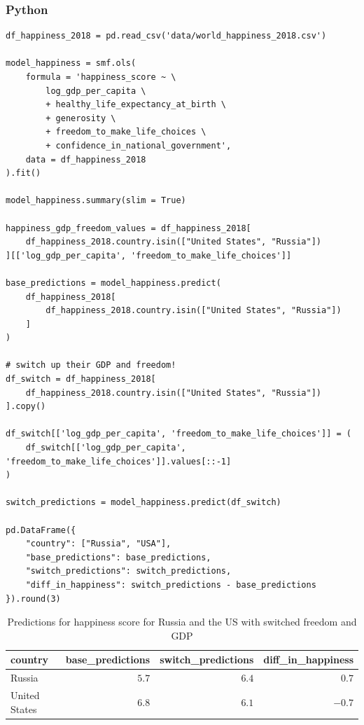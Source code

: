 \documentclass[
  letterpaper,
]{krantz}
\begin{document}
\subsubsection{Python}

\begin{verbatim}
df_happiness_2018 = pd.read_csv('data/world_happiness_2018.csv')

model_happiness = smf.ols(
    formula = 'happiness_score ~ \
        log_gdp_per_capita \
        + healthy_life_expectancy_at_birth \
        + generosity \
        + freedom_to_make_life_choices \
        + confidence_in_national_government',
    data = df_happiness_2018
).fit()

model_happiness.summary(slim = True)

happiness_gdp_freedom_values = df_happiness_2018[
    df_happiness_2018.country.isin(["United States", "Russia"])
][['log_gdp_per_capita', 'freedom_to_make_life_choices']]

base_predictions = model_happiness.predict(
    df_happiness_2018[
        df_happiness_2018.country.isin(["United States", "Russia"])
    ]
)

# switch up their GDP and freedom!
df_switch = df_happiness_2018[
    df_happiness_2018.country.isin(["United States", "Russia"])
].copy()

df_switch[['log_gdp_per_capita', 'freedom_to_make_life_choices']] = (
    df_switch[['log_gdp_per_capita', 'freedom_to_make_life_choices']].values[::-1]
)    

switch_predictions = model_happiness.predict(df_switch)

pd.DataFrame({
    "country": ["Russia", "USA"],
    "base_predictions": base_predictions,
    "switch_predictions": switch_predictions,
    "diff_in_happiness": switch_predictions - base_predictions
}).round(3)
\end{verbatim}

\begin{longtable}{lrrr}

\caption{\label{tbl-counterfactual-happiness}Predictions for happiness
score for Russia and the US with switched freedom and GDP}

\tabularnewline

\toprule
country & base\_predictions & switch\_predictions & diff\_in\_happiness \\ 
\midrule\addlinespace[2.5pt]
Russia & \textcolor[HTML]{404040}{$5.7$} & \textcolor[HTML]{404040}{$6.4$} & \textcolor[HTML]{404040}{$0.7$} \\ 
United States & \textcolor[HTML]{404040}{$6.8$} & \textcolor[HTML]{404040}{$6.1$} & \textcolor[HTML]{404040}{$-0.7$} \\ 
\bottomrule

\end{longtable}
\end{document}
